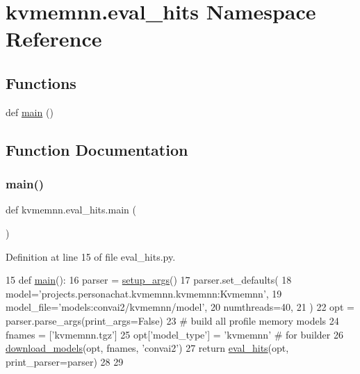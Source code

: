 \hypertarget{namespacekvmemnn_1_1eval__hits}{}\section{kvmemnn.\+eval\+\_\+hits Namespace Reference}
\label{namespacekvmemnn_1_1eval__hits}
\subsection*{Functions}
\begin{DoxyCompactItemize}
\item 
def \hyperlink{namespacekvmemnn_1_1eval__hits_a1df5812420600d93fdd4db358ad0e301}{main} ()
\end{DoxyCompactItemize}


\subsection{Function Documentation}
\mbox{\label{namespacekvmemnn_1_1eval__hits_a1df5812420600d93fdd4db358ad0e301}} 
\subsubsection{\texorpdfstring{main()}{main()}}
{\footnotesize\ttfamily def kvmemnn.\+eval\+\_\+hits.\+main (\begin{DoxyParamCaption}{ }\end{DoxyParamCaption})}



Definition at line 15 of file eval\+\_\+hits.\+py.


\begin{DoxyCode}
15 \textcolor{keyword}{def }\hyperlink{namespaceseq2seq_1_1eval__hits_a6cc44d7d896f1429f58e24fb6e78a8c8}{main}():
16     parser = \hyperlink{namespaceprojects_1_1convai2_1_1eval__hits_a276af35abce11628a8e697b370218cf4}{setup\_args}()
17     parser.set\_defaults(
18         model=\textcolor{stringliteral}{'projects.personachat.kvmemnn.kvmemnn:Kvmemnn'},
19         model\_file=\textcolor{stringliteral}{'models:convai2/kvmemnn/model'},
20         numthreads=40,
21     )
22     opt = parser.parse\_args(print\_args=\textcolor{keyword}{False})
23     \textcolor{comment}{# build all profile memory models}
24     fnames = [\textcolor{stringliteral}{'kvmemnn.tgz'}]
25     opt[\textcolor{stringliteral}{'model\_type'}] = \textcolor{stringliteral}{'kvmemnn'}  \textcolor{comment}{# for builder}
26     \hyperlink{namespaceparlai_1_1core_1_1build__data_ab697f23f05d3e36d7979fe5e0ed7911e}{download\_models}(opt, fnames, \textcolor{stringliteral}{'convai2'})
27     \textcolor{keywordflow}{return} \hyperlink{namespaceprojects_1_1convai2_1_1eval__hits_a400fd6a2e183f2cf1da6ebeff169fe70}{eval\_hits}(opt, print\_parser=parser)
28 
29 
\end{DoxyCode}
